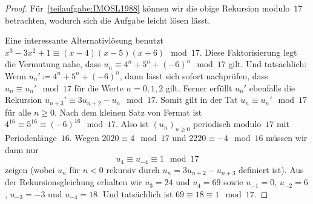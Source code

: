 \begin{proof}
	Für~\ref{teilaufgabe:IMOSL1988} können wir die obige Rekursion modulo~$17$ betrachten, wodurch sich die Aufgabe leicht lösen lässt.
	
	Eine interessante Alternativlösung benutzt $x^3-3x^2+1\equiv (x-4)(x-5)(x+6)\mod 17$. Diese Faktorisierung legt die Vermutung nahe, dass $u_n\equiv 4^n+5^n+(-6)^n\mod 17$ gilt. Und tatsächlich: Wenn $u_n'\coloneqq 4^n+5^n+(-6)^n$, dann lässt sich sofort nachprüfen, dass $u_n\equiv u_n'\mod 17$ für die Werte $n=0,1,2$ gilt. Ferner erfüllt $u_n'$ ebenfalls die Rekursion $u_{n+3}'\equiv 3u_{n+2}-u_n\mod 17$. Somit gilt in der Tat $u_n\equiv u_n'\mod 17$ für alle $n\geqslant 0$. Nach dem kleinen Satz von Fermat ist $4^{16}\equiv 5^{16}\equiv (-6)^{16}\mod 17$. Also ist $(u_n)_{n\geqslant 0}$ periodisch modulo~$17$ mit Periodenlänge~$16$. Wegen $2020\equiv 4\mod 17$ und $2220\equiv -4\mod 16$ müssen wir dann nur
	\begin{equation*}
		u_4\equiv u_{-4}\equiv 1\mod 17
	\end{equation*}
	zeigen (wobei $u_n$ für $n<0$ rekursiv durch $u_n=3u_{n+2}-u_{n+3}$ definiert ist). Aus der Rekursionsgleichung erhalten wir $u_3=24$ und $u_4=69$ sowie $u_{-1}=0$, $u_{-2}=6$, $u_{-3}=-3$ und $u_{-4}=18$. Und tatsächlich ist $69\equiv 18\equiv 1\mod 17$.
\end{proof}

